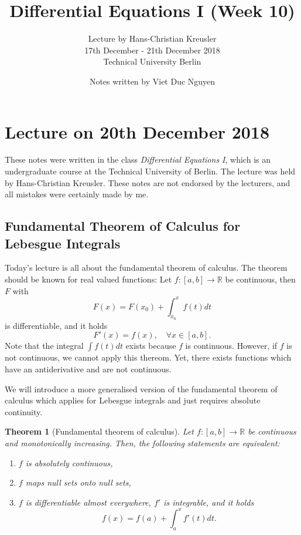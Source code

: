 \documentclass[a4paper, 11pt]{article}
\newtheorem{theorem}{Theorem}
\begin{document}
\title{Differential Equations I (Week 10) }
\author{ Lecture by Hans-Christian Kreusler \\ 17th December - 21th December 2018 \\ Technical University Berlin}
\date{ Notes written by Viet Duc Nguyen}
\maketitle
\tableofcontents


\section{Lecture on 20th December 2018}
These notes were written in the class \emph{Differential Equations I}, which is an undergraduate course at the Technical University of Berlin. The lecture was held by Hans-Christian Kreusler. These notes are not endorsed by the lecturers, and all mistakes were certainly made by me.

\subsection*{Fundamental Theorem of Calculus for Lebesgue Integrals}
Today's lecture is all about the fundamental theorem of calculus. The theorem should be known for real valued functions: Let $f: [a,b] \to \mathbb R$ be continuous, then $F$ with
\[
	F(x) = F(x_0) + \int^x_{x_0}f(t)dt
\]
is differentiable, and it holds
\[
	F'(x) = f(x), \quad \forall x \in [a,b].
\]
Note that the integral $\int f(t)dt$ exists because $f$ is continuous. However, if $f$ is not continuous, we cannot apply this thereom. Yet, there exists functions which have an antiderivative and are not continuous. 

We will introduce a more generalised version of the fundamental theorem of calculus which applies for Lebesgue integrals and just requires absolute continuity.

\begin{theorem}[Fundamental theorem of calculus]
	Let $f:[a,b] \to \mathbb R$ be continuous and monotonically increasing. Then, the following statements are equivalent:
	\begin{enumerate}
		\item $f$ is absolutely continuous,
		\item $f$ maps null sets onto null sets,
		\item $f$ is differentiable almost everywhere, $f'$ is integrable, and it holds
		\[
			f(x) = f(a) + \int^x_{a}f'(t)dt.
		\]
	\end{enumerate}
\end{theorem} 
\end{document}
